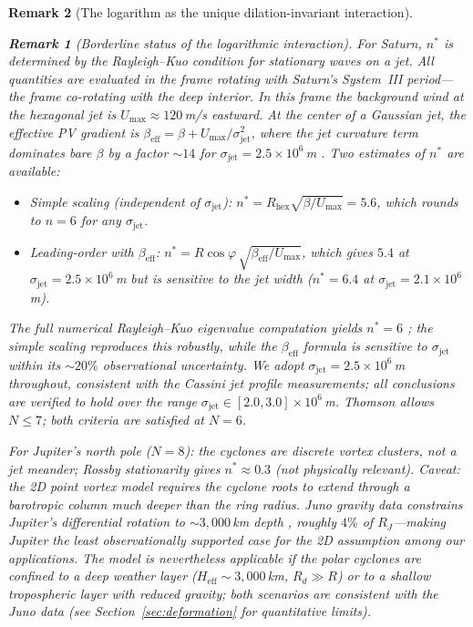 \documentclass[12pt, a4paper]{article}
\newtheorem{remark}{Remark}[section]
\numberwithin{equation}{section}
\begin{document}
\begin{remark}[The logarithm as the unique dilation-invariant interaction]
\begin{remark}[Borderline status of the logarithmic interaction]
For Saturn, $n^*$ is determined by the Rayleigh--Kuo condition for
stationary waves on a jet.  All quantities are evaluated in the frame
rotating with Saturn's System~III period---the frame co-rotating with
the deep interior.  In this frame the background wind at the hexagonal
jet is $U_{\max} \approx 120$\,m/s eastward.  At the center of a
Gaussian jet, the effective PV gradient is
$\beta_{\mathrm{eff}} = \beta + U_{\max}/\sigma_{\mathrm{jet}}^2$,
where the jet curvature term dominates bare $\beta$ by a factor
$\sim\!14$ for $\sigma_{\mathrm{jet}} = 2.5 \times 10^6$\,m
\citep{Pedlosky1987, Vallis2017}.
Two estimates of $n^*$ are available:
\begin{itemize}
  \item \emph{Simple scaling} (independent of $\sigma_{\mathrm{jet}}$):
    $n^* = R_{\mathrm{hex}}\sqrt{\beta/U_{\max}} = 5.6$, which
    rounds to $n = 6$ for any $\sigma_{\mathrm{jet}}$.
  \item \emph{Leading-order with $\beta_{\mathrm{eff}}$}:
    $n^* = R\cos\varphi\,\sqrt{\beta_{\mathrm{eff}}/U_{\max}}$,
    which gives $5.4$ at $\sigma_{\mathrm{jet}} = 2.5 \times 10^6$\,m
    but is sensitive to the jet width ($n^* = 6.4$ at
    $\sigma_{\mathrm{jet}} = 2.1 \times 10^6$\,m).
\end{itemize}
The full numerical Rayleigh--Kuo eigenvalue computation yields
$n^* = 6$ \citep{SanchezLavega2014}; the simple scaling reproduces
this robustly, while the $\beta_{\mathrm{eff}}$ formula is sensitive
to $\sigma_{\mathrm{jet}}$ within its $\sim\!20\%$ observational
uncertainty.  We adopt
$\sigma_{\mathrm{jet}} = 2.5 \times 10^6$\,m throughout, consistent
with the Cassini jet profile measurements; all conclusions are
verified to hold over the range
$\sigma_{\mathrm{jet}} \in [2.0, 3.0] \times 10^6$\,m.
Thomson allows $N \le 7$; both criteria are satisfied at $N = 6$.

For Jupiter's north pole ($N = 8$): the cyclones are discrete vortex
clusters, not a jet meander; Rossby stationarity gives
$n^* \approx 0.3$ (not physically relevant).  \emph{Caveat:} the 2D
point vortex model requires the cyclone roots to extend through a
barotropic column much deeper than the ring radius.  Juno gravity
data constrains Jupiter's differential rotation to
$\sim\!3{,}000$\,km depth \citep{Kaspi2018}, roughly $4\%$ of
$R_J$---making Jupiter the least observationally supported case for
the 2D assumption among our applications.  The model is nevertheless
applicable if the polar cyclones are confined to a deep weather layer
($H_{\mathrm{eff}} \sim 3{,}000$\,km, $R_d \gg R$) or to a shallow
tropospheric layer with reduced gravity; both scenarios are consistent
with the Juno data (see Section~\ref{sec:deformation} for
quantitative limits).


\end{remark}
\end{remark}
\end{document}
